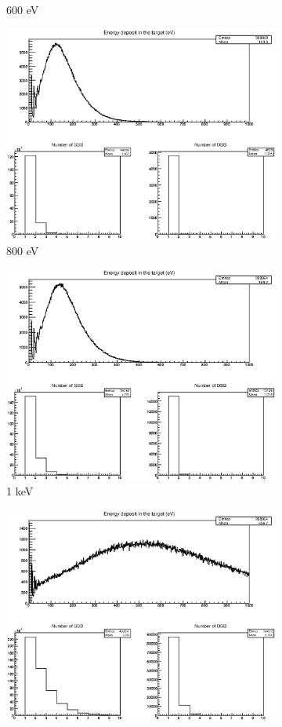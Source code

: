 \begin{figure}
\begin{subfigure}{.5\textwidth}
  \caption{600 eV}
  \label{fig:sub3}
\end{subfigure}%
\begin{subfigure}{.5\textwidth}
  \centering
  \includegraphics[width=.78\linewidth]{./Figures/1zbbp800ev.eps}
  \caption{800 eV}
  \label{fig:sub4}
\end{subfigure}
\begin{subfigure}{.5\textwidth}
  \centering
  \includegraphics[width=.78\linewidth]{./Figures/1zbbp1kev.eps}
  \caption{1 keV}
  \label{fig:sub5}
\end{subfigure}%
\begin{subfigure}{.5\textwidth}
  \centering
  \includegraphics[width=.78\linewidth]{./Figures/1zbbp200kev.eps}

\end{subfigure}
\end{figure}
